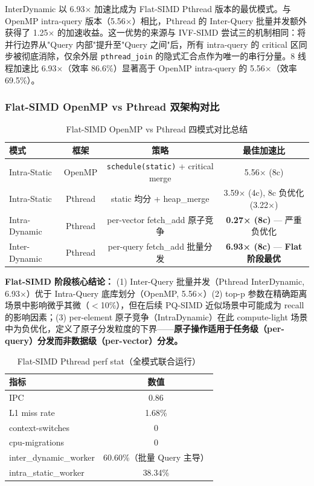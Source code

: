 \documentclass[UTF8,a4paper,10pt]{ctexart}
\begin{document}
InterDynamic 以 6.93× 加速比成为 Flat-SIMD Pthread 版本的最优模式。与 OpenMP intra-query 版本（5.56×）相比，Pthread 的 Inter-Query 批量并发额外获得了 1.25× 的加速收益。这一优势的来源与 IVF-SIMD 尝试三的机制相同：将并行边界从"Query 内部"提升至"Query 之间"后，所有 intra-query 的 critical 区同步被彻底消除，仅余外层 \texttt{pthread\_join} 的隐式汇合点作为唯一的串行分量。8 线程加速比 6.93×（效率 86.6\%）显著高于 OpenMP intra-query 的 5.56×（效率 69.5\%）。

\subsubsection{Flat-SIMD OpenMP vs Pthread 双架构对比}

\begin{table}[H]
\centering
\caption{Flat-SIMD OpenMP vs Pthread 四模式对比总结}
\begin{tabular}{lccc}
\hline
模式 & 框架 & 策略 & 最佳加速比 \\
\hline
Intra-Static & OpenMP & \texttt{schedule(static)} + critical merge & 5.56× (8c) \\
Intra-Static & Pthread & static 均分 + heap\_merge & 3.59× (4c), 8c 负优化(3.22×) \\
Intra-Dynamic & Pthread & per-vector fetch\_add 原子竞争 & \textbf{0.27× (8c)} — 严重负优化 \\
Inter-Dynamic & Pthread & per-query fetch\_add 批量分发 & \textbf{6.93× (8c)} — \textbf{Flat 阶段最优} \\
\hline
\end{tabular}
\end{table}

\textbf{Flat-SIMD 阶段核心结论：} (1) Inter-Query 批量并发（Pthread InterDynamic, 6.93×）优于 Intra-Query 底库划分（OpenMP, 5.56×）(2) top-p 参数在精确距离场景中影响微乎其微（$<$10\%），但在后续 PQ-SIMD 近似场景中可能成为 recall 的影响因素；(3) per-element 原子竞争（IntraDynamic）在此 compute-light 场景中为负优化，定义了原子分发粒度的下界——\textbf{原子操作适用于任务级（per-query）分发而非数据级（per-vector）分发。}

\begin{table}[H]
\centering
\caption{Flat-SIMD Pthread perf stat（全模式联合运行）}
\begin{tabular}{lc}
\hline
指标 & 数值 \\
\hline
IPC & 0.86 \\
L1 miss rate & 1.68\% \\
context-switches & 0 \\
cpu-migrations & 0 \\
inter\_dynamic\_worker & 60.60\%（批量 Query 主导） \\
intra\_static\_worker & 38.34\% \\
\hline
\end{tabular}
\end{table}
\end{document}
